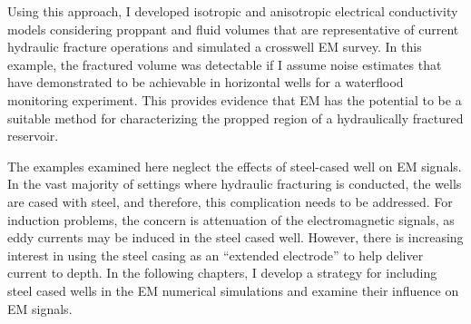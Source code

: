 Using this approach, I developed isotropic and anisotropic electrical conductivity models considering proppant and fluid volumes that are representative of current hydraulic fracture operations and simulated a crosswell EM survey. In this example, the fractured volume was detectable if I assume noise estimates that have demonstrated to be achievable in horizontal wells for a waterflood monitoring experiment. This provides evidence that EM has the potential to be a suitable method for characterizing the propped region of a hydraulically fractured reservoir.

The examples examined here neglect the effects of steel-cased well on EM signals. In the vast majority of settings where hydraulic fracturing is conducted, the wells are cased with steel, and therefore, this complication  needs to be addressed. For induction problems, the concern is attenuation of the electromagnetic signals, as eddy currents may be induced in the steel cased well. However, there is increasing interest in using the steel casing as an ``extended electrode'' to help deliver current to depth. In the following chapters, I develop a strategy for including steel cased wells in the EM numerical simulations and examine their influence on EM signals.

